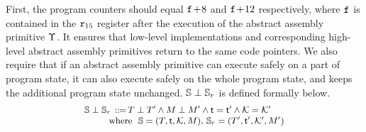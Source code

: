 First,
the program counters should equal
$\texttt{f}_{}\!+\!8$ and $\texttt{f}_{}\!+\!12$ respectively, where $\texttt{f}_{}$
is contained in the $\texttt{r}_{15}$ register after the execution
of the abstract assembly primitive $\Upsilon$.
It ensures that low-level implementations
and corresponding
high-level abstract assembly primitives 
return to the same code pointers.
We also require that
if an abstract assembly primitive
can execute safely on a part of program state,
it can also execute safely on the whole program state,
and keeps the additional program state unchanged.
$\mathbb{S}\perp\mathbb{S}_r$ is defined formally below.
\[
    \small
    \begin{array}{l}
        \mathbb{S}\perp\mathbb{S}_r \, ::\!\!{=} \,
        T\perp T' \land
        M\perp M' \land \textsf{t} = \textsf{t}'
        \land \mathcal{K} = \mathcal{K}' \\
        \qquad \ \
        \text{where} \ \
        \mathbb{S} = (T, \textsf{t}, \mathcal{K}, M), \,
        \mathbb{S}_r = (T', \textsf{t}', \mathcal{K}', M')
    \end{array}
\]
